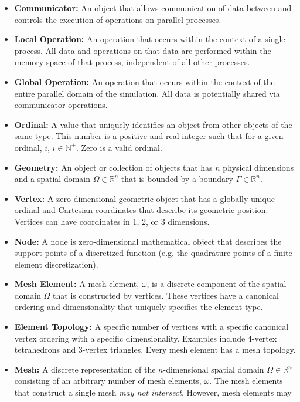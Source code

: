 \documentclass[letterpaper,12pt]{article}
\begin{document}
\begin{itemize}
\item {\bf Communicator:} An object that allows communication of data
  between and controls the execution of operations on parallel
  processes.
\item {\bf Local Operation:} An operation that occurs within the
  context of a single process. All data and operations on that data
  are performed within the memory space of that process, independent
  of all other processes.
\item {\bf Global Operation:} An operation that occurs within the
  context of the entire parallel domain of the simulation. All data is
  potentially shared via communicator operations.
\item {\bf Ordinal:} A value that uniquely identifies an object from
  other objects of the same type. This number is a positive and real
  integer such that for a given ordinal, $i$, $i \in
  \mathbb{N}^{+}$. Zero is a valid ordinal.
\item {\bf Geometry:} An object or collection of objects that has $n$
  physical dimensions and a spatial domain $\Omega \in \mathbb{R}^n$
  that is bounded by a boundary $\Gamma \in \mathbb{R}^n$.
\item {\bf Vertex:} A zero-dimensional geometric object that has a
  globally unique ordinal and Cartesian coordinates that describe its
  geometric position. Vertices can have coordinates in 1, 2, or 3
  dimensions.
\item {\bf Node:} A node is zero-dimensional mathematical object that
  describes the support points of a discretized function (e.g. the
  quadrature points of a finite element discretization).
\item {\bf Mesh Element:} A mesh element, $\omega$, is a discrete
  component of the spatial domain $\Omega$ that is constructed by
  vertices. These vertices have a canonical ordering and
  dimensionality that uniquely specifies the element type.
\item {\bf Element Topology:} A specific number of vertices with a
  specific canonical vertex ordering with a specific
  dimensionality. Examples include 4-vertex tetrahedrons and 3-vertex
  triangles. Every mesh element has a mesh topology.
\item {\bf Mesh:} A discrete representation of the $n$-dimensional
  spatial domain $\Omega \in \mathbb{R}^n$ consisting of an arbitrary
  number of mesh elements, $\omega$. The mesh elements that construct
  a single mesh {\sl may not intersect}. However, mesh elements may

\end{itemize}
\end{document}
